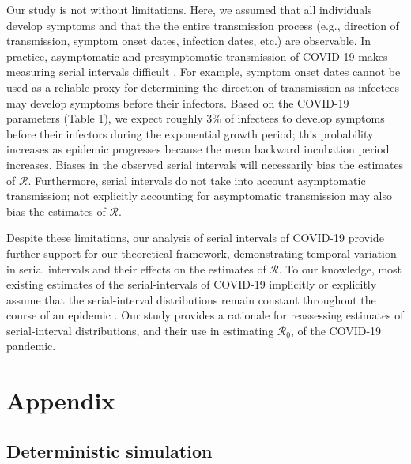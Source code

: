 \documentclass[12pt]{article}
\newcommand{\Rx}[1]{\ensuremath{{\mathcal R}_{#1}}\xspace}
\newcommand{\Ro}{\Rx{0}}
\newcommand{\RR}{\ensuremath{{\mathcal R}}\xspace}
\begin{document}
Our study is not without limitations.
Here, we assumed that all individuals develop symptoms and that the the entire transmission process (e.g., direction of transmission, symptom onset dates, infection dates, etc.) are observable.
In practice, asymptomatic and presymptomatic transmission of COVID-19 makes measuring serial intervals difficult \citep{bai2020presumed,he2020temporal,wei2020presymptomatic}.
For example, symptom onset dates cannot be used as a reliable proxy for determining the direction of transmission as infectees may develop symptoms before their infectors.
Based on the COVID-19 parameters (Table 1), we expect roughly 3\% of infectees to develop symptoms before their infectors during the exponential growth period; 
this probability increases as epidemic progresses because the mean backward incubation period increases.
Biases in the observed serial intervals will necessarily bias the estimates of \RR. 
Furthermore, serial intervals do not take into account asymptomatic transmission; 
not explicitly accounting for asymptomatic transmission may also bias the estimates of \RR \citep{park2020time}.

Despite these limitations, our analysis of serial intervals of COVID-19 provide further support for our theoretical framework, demonstrating temporal variation in serial intervals and their effects on the estimates of \RR.
To our knowledge, most existing estimates of the serial-intervals of COVID-19 implicitly or explicitly assume that the serial-interval distributions remain constant throughout the course of an epidemic \citep{du2020serial, he2020temporal, nishiura2020serial,tindale2020transmission,zhao2020estimating,zhang2020evolving}.
Our study provides a rationale for reassessing estimates of serial-interval distributions, and their use in estimating \Ro, of the COVID-19 pandemic.

\pagebreak

\section{Appendix}

\subsection{Deterministic simulation}
\end{document}
